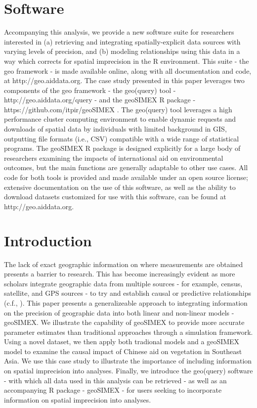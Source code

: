 \section{Software}
Accompanying this analysis, we provide a new software suite for researchers interested in (a) retrieving and integrating spatially-explicit data sources with varying levels of precision, and (b) modeling relationships using this data in a way which corrects for spatial imprecision in the R environment.  This suite - the geo framework - is made available online, along with all documentation and code, at http://geo.aiddata.org.  The case study presented in this paper leverages two components of the geo framework - the geo(query) tool - http://geo.aiddata.org/query - and the geoSIMEX R package - https://github.com/itpir/geoSIMEX . The geo(query) tool leverages a high performance cluster computing environment to enable dynamic requests and downloads of spatial data by individuals with limited background in GIS, outputting file formats (i.e., CSV) compatible with a wide range of statistical programs.  The geoSIMEX R package is designed explicitly for a large body of researchers examining the impacts of international aid on environmental outcomes, but the main functions are generally adaptable to other use cases. All code for both tools is provided and made available under an open source license; extensive documentation on the use of this software, as well as the ability to download datasets customized for use with this software, can be found at http://geo.aiddata.org.
\newpage

\section{Introduction}
The lack of exact geographic information on where measurements are obtained presents a barrier to research.
This has become increasingly evident as more scholars integrate geographic data from multiple sources - for example, census, satellite, and GPS sources - to try and establish causal or predictive relationships (c.f., \cite{bare_assessing_2015,buntaine_titling_2015,gallo_mapping_2012,andam_measuring_2008,buchanan_impacts_2016,benyishay_indigenous_2016,runfola_migration_2016,runfola_multi-criteria_2015}).
This paper presents a generalizeable approach to integrating information on the precision of geographic data into both linear and non-linear models - geoSIMEX.
We illustrate the capability of geoSIMEX to provide more accurate parameter estimates than traditional approaches through a simulation framework. 
Using a novel dataset, we then apply both tradional models and a geoSIMEX model to examine the causal impact of Chinese aid on vegetation in Southeast Asia.
We use this case study to illustrate the importance of including information on spatial imprecision into analyses.
Finally, we introduce the geo(query) software - with which all data used in this analysis can be retrieved - as well as an accompanying R package - geoSIMEX - for users seeking to incorporate information on spatial imprecision into analyses.


